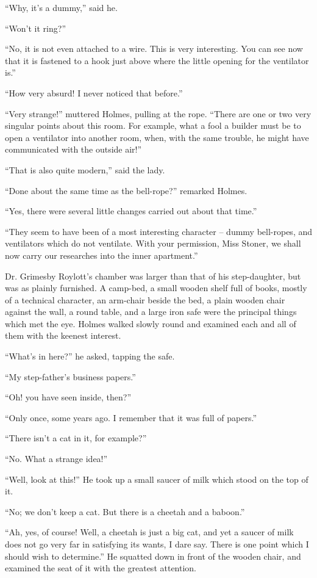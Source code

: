 “Why, it’s a dummy,” said he.

“Won’t it ring?”

“No, it is not even attached to a wire. This is very interesting.
You can see now that it is fastened to a hook just
above where the little opening for the ventilator is.”

“How very absurd! I never noticed that before.”

“Very strange!” muttered Holmes, pulling at the rope.
“There are one or two very singular points about this room.
For example, what a fool a builder must be to open a ventilator
into another room, when, with the same trouble, he might
have communicated with the outside air!”

“That is also quite modern,” said the lady.

“Done about the same time as the bell-rope?” remarked
Holmes.

“Yes, there were several little changes carried out about
that time.”

“They seem to have been of a most interesting character -- dummy
bell-ropes, and ventilators which do not ventilate.
With your permission, Miss Stoner, we shall now carry our
researches into the inner apartment.”

Dr. Grimesby Roylott’s chamber was larger than that of his
step-daughter, but was as plainly furnished. A camp-bed, a
small wooden shelf full of books, mostly of a technical character,
an arm-chair beside the bed, a plain wooden chair against
the wall, a round table, and a large iron safe were the principal
things which met the eye. Holmes walked slowly round
and examined each and all of them with the keenest interest.

“What’s in here?” he asked, tapping the safe.

“My step-father’s business papers.”

“Oh! you have seen inside, then?”

“Only once, some years ago. I remember that it was full
of papers.”

“There isn’t a cat in it, for example?”

“No. What a strange idea!”

“Well, look at this!” He took up a small saucer of milk
which stood on the top of it.

“No; we don’t keep a cat. But there is a cheetah and a
baboon.”

“Ah, yes, of course! Well, a cheetah is just a big cat, and
yet a saucer of milk does not go very far in satisfying its
wants, I dare say. There is one point which I should wish to
determine.” He squatted down in front of the wooden chair,
and examined the seat of it with the greatest attention.

